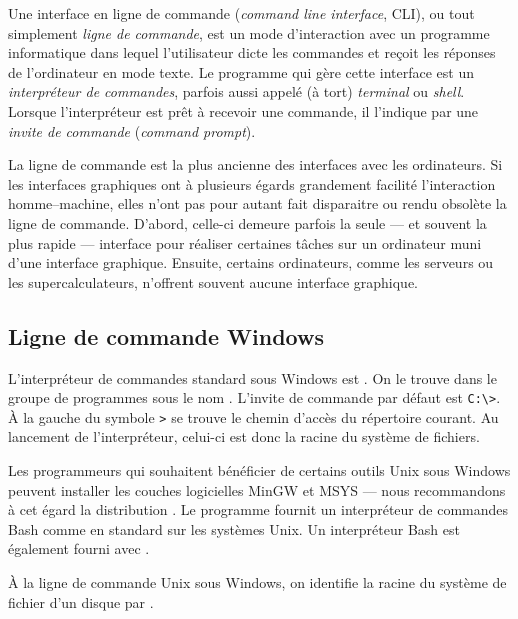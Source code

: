 Une interface en ligne de commande
(\emph{command line interface}, CLI), ou tout simplement \emph{ligne
  de commande}, est un mode d'interaction avec un programme
informatique dans lequel l'utilisateur dicte les commandes et reçoit
les réponses de l'ordinateur en mode texte. Le programme qui gère
cette interface est un \emph{interpréteur de commandes}, parfois aussi
appelé (à tort) \emph{terminal} ou \emph{shell}. Lorsque
l'interpréteur est prêt à recevoir une commande, il l'indique par une
\emph{invite de commande} (\emph{command prompt}).

La ligne de commande est la plus ancienne des interfaces avec les
ordinateurs. Si les interfaces graphiques ont à plusieurs égards
grandement facilité l'interaction homme--machine, elles n'ont pas pour
autant fait disparaitre ou rendu obsolète la ligne de commande.
D'abord, celle-ci demeure parfois la seule --- et souvent la plus
rapide --- interface pour réaliser certaines tâches sur un ordinateur
muni d'une interface graphique. Ensuite, certains ordinateurs, comme
les serveurs ou les supercalculateurs, n'offrent souvent aucune
interface graphique.

\subsection{Ligne de commande Windows}
\label{sec:informatique:cli:windows}

L'interpréteur de commandes standard sous Windows est
. On le trouve dans le groupe
de programmes  sous le nom . L'invite de commande par défaut est \verb=C:\>=. À la
gauche du symbole \verb=>= se trouve le chemin d'accès du répertoire
courant. Au lancement de l'interpréteur, celui-ci est donc la racine
du système de fichiers.

Les programmeurs qui souhaitent bénéficier de certains outils Unix
sous Windows peuvent installer les couches logicielles
MinGW et MSYS --- nous recommandons à cet
égard la distribution .
Le programme  fournit un interpréteur de commandes
Bash \citep{bash} comme en standard sur les systèmes Unix.
Un interpréteur Bash est également fourni avec
.

À la ligne de commande Unix sous Windows, on identifie la racine
 du système de fichier d'un disque par
.

